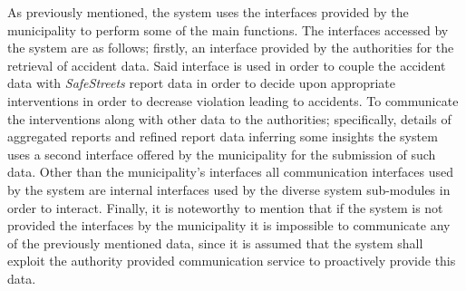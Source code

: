 As previously mentioned, the system uses the interfaces provided by the municipality to perform some of the main functions. The interfaces accessed by the system are as follows; firstly, an interface provided by the authorities for the retrieval of accident data. Said interface is used in order to couple the accident data with \emph{SafeStreets} report data in order to decide upon appropriate interventions in order to decrease violation leading to accidents. To communicate the interventions along with other data to the authorities; specifically, details of aggregated reports and refined report data inferring some insights the system uses a second interface offered by the municipality for the submission of such data. Other than the municipality's interfaces all communication interfaces used by the system are internal interfaces used by the diverse system sub-modules in order to interact. Finally, it is noteworthy to mention that if the system is not provided the interfaces by the municipality it is impossible to communicate any of the previously mentioned data, since it is assumed that the system shall exploit the authority provided communication service to proactively provide this data.